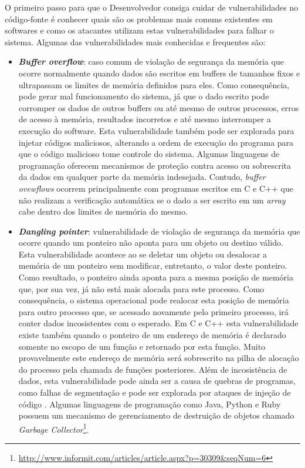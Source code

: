 %

O primeiro passo para que o Desenvolvedor consiga cuidar de vulnerabilidades no código-fonte é conhecer quais são os problemas mais comuns existentes em softwares e como os atacantes utilizam estas vulnerabilidades para falhar o sistema. Algumas das vulnerabilidades mais conhecidas e frequentes são:

%

\begin{itemize}
\item \textbf{\emph{Buffer overflow}}: caso comum de violação de segurança da memória que ocorre normalmente quando dados são escritos em buffers de tamanhos fixos e ultrapassam os limites de memória definidos para eles. Como consequência, pode gerar mal funcionamento do sistema, já que o dado escrito pode corromper os dados de outros buffers ou até mesmo de outros processos, erros de acesso à memória, resultados incorretos e até mesmo interromper a execução do software. Esta vulnerabilidade também pode ser explorada para injetar códigos maliciosos, alterando a ordem de execução do programa para que o código malicioso tome controle do sistema. Algumas linguagens de programação oferecem mecanismos de proteção contra acesso ou sobrescrita da dados em qualquer parte da memória indesejada. Contudo, \emph{buffer ovewflows} ocorrem principalmente com programas escritos em C e C++ que não realizam a verificação automática se o dado a ser escrito em um \emph{array} cabe dentro dos limites de memória do mesmo.
\item \textbf{\emph{Dangling pointer}}: vulnerabilidade de violação de segurança da memória que ocorre quando um ponteiro não aponta para um objeto ou destino válido. Esta vulnerabilidade acontece ao se deletar um objeto ou desalocar a memória de um ponteiro sem modificar, entretanto, o valor deste ponteiro. Como resultado, o ponteiro ainda aponta para a mesma posição de memória que, por sua vez, já não está mais alocada para este processo. Como consequência, o sistema operacional pode realocar esta posição de memória para outro processo que, se acessado novamente pelo primeiro processo, irá conter dados incosistentes com o esperado. Em C e C++ esta vulnerabilidade existe também quando o ponteiro de um endereço de memória é declarado somente no escopo de um função e retornado por esta função. Muito provavelmente este endereço de memória será sobrescrito na pilha de alocação do processo pela chamada de funções posteriores. Além de incosistência de dados, esta vulnerabilidade pode ainda ser a causa de quebras de programas, como falhas de segmentação e pode ser explorada por ataques de injeção de código \cite{afek2007}. Algumas linguagens de programação como Java, Python e Ruby possuem um mecanismo de gerenciamento de destruição de objetos chamado \emph{Garbage Collector}\footnote{\url{http://www.informit.com/articles/article.aspx?p=30309&seqNum=6}}. 

\end{itemize}
